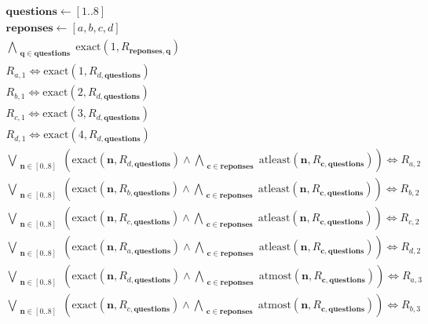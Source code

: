 \documentclass[fleqn]{article}
\begin{document}
\begin{multline*}
\mathbf{questions} \leftarrow [1..8]\\
\mathbf{reponses} \leftarrow [a,b,c,d]\\
\bigwedge\limits_{\substack{\mathbf{q}\in \mathbf{questions}}}\textrm{exact}(1,R_{\mathbf{reponses},\mathbf{q}})\\
R_{a,1} \Leftrightarrow \textrm{exact}(1,R_{d,\mathbf{questions}})\\
R_{b,1} \Leftrightarrow \textrm{exact}(2,R_{d,\mathbf{questions}})\\
R_{c,1} \Leftrightarrow \textrm{exact}(3,R_{d,\mathbf{questions}})\\
R_{d,1} \Leftrightarrow \textrm{exact}(4,R_{d,\mathbf{questions}})\\
\bigvee\limits_{\substack{\mathbf{n}\in [0..8]}}\left(\textrm{exact}(\mathbf{n},R_{d,\mathbf{questions}}) \wedge \bigwedge\limits_{\substack{\mathbf{c}\in \mathbf{reponses}}}\textrm{atleast}(\mathbf{n},R_{\mathbf{c},\mathbf{questions}})\right) \Leftrightarrow R_{a,2}\\
\bigvee\limits_{\substack{\mathbf{n}\in [0..8]}}\left(\textrm{exact}(\mathbf{n},R_{b,\mathbf{questions}}) \wedge \bigwedge\limits_{\substack{\mathbf{c}\in \mathbf{reponses}}}\textrm{atleast}(\mathbf{n},R_{\mathbf{c},\mathbf{questions}})\right) \Leftrightarrow R_{b,2}\\
\bigvee\limits_{\substack{\mathbf{n}\in [0..8]}}\left(\textrm{exact}(\mathbf{n},R_{c,\mathbf{questions}}) \wedge \bigwedge\limits_{\substack{\mathbf{c}\in \mathbf{reponses}}}\textrm{atleast}(\mathbf{n},R_{\mathbf{c},\mathbf{questions}})\right) \Leftrightarrow R_{c,2}\\
\bigvee\limits_{\substack{\mathbf{n}\in [0..8]}}\left(\textrm{exact}(\mathbf{n},R_{a,\mathbf{questions}}) \wedge \bigwedge\limits_{\substack{\mathbf{c}\in \mathbf{reponses}}}\textrm{atleast}(\mathbf{n},R_{\mathbf{c},\mathbf{questions}})\right) \Leftrightarrow R_{d,2}\\
\bigvee\limits_{\substack{\mathbf{n}\in [0..8]}}\left(\textrm{exact}(\mathbf{n},R_{d,\mathbf{questions}}) \wedge \bigwedge\limits_{\substack{\mathbf{c}\in \mathbf{reponses}}}\textrm{atmost}(\mathbf{n},R_{\mathbf{c},\mathbf{questions}})\right) \Leftrightarrow R_{a,3}\\
\bigvee\limits_{\substack{\mathbf{n}\in [0..8]}}\left(\textrm{exact}(\mathbf{n},R_{c,\mathbf{questions}}) \wedge \bigwedge\limits_{\substack{\mathbf{c}\in \mathbf{reponses}}}\textrm{atmost}(\mathbf{n},R_{\mathbf{c},\mathbf{questions}})\right) \Leftrightarrow R_{b,3}\\

\end{multline*}
\end{document}

